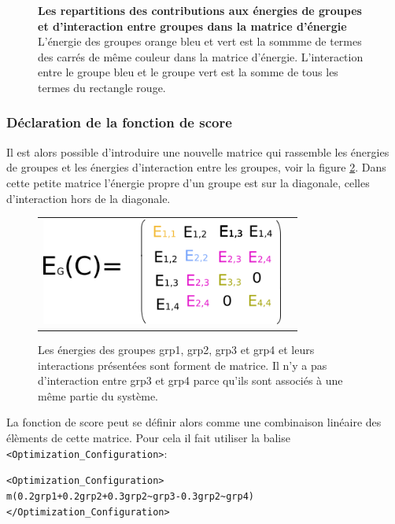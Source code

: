 \begin{enumerate}
\begin{figure}[!htbp]
     \caption{\textbf{Les repartitions des contributions aux énergies de groupes et d'interaction entre groupes dans la matrice d'énergie} L'énergie des groupes orange bleu et vert est la sommme de termes des carrés de même couleur dans la matrice d'énergie. L'interaction entre le groupe bleu et le groupe vert est la somme de tous les termes du rectangle rouge.}
\label{fig:matrix_grp}
   \end{figure}
   

\subsubsection{Déclaration de la fonction de score}
\label{sub:score}
Il est alors possible d'introduire une nouvelle matrice qui rassemble les énergies de groupes et les énergies d'interaction entre les groupes, voir la figure \ref{fig:group_matrix}. Dans cette petite matrice l'énergie propre d'un groupe est sur la diagonale, celles d'interaction hors de la diagonale.



   \begin{figure}[!htbp]
     \centering
     \begin{tabular}{cc}
       \includegraphics[width=8cm]{figure/group_matrix.png} &
     \end{tabular}
     
     \caption{ Les énergies des groupes grp1, grp2, grp3 et grp4 et leurs interactions présentées sont forment de matrice. Il n'y a pas d'interaction entre grp3 et grp4 parce qu'ils sont associés à une même partie du système.}
\label{fig:group_matrix}
   \end{figure}

La fonction de score peut se définir alors comme une combinaison linéaire des élèments de cette matrice. Pour cela il fait utiliser la balise  \verb!<Optimization_Configuration>!:



\verb!<Optimization_Configuration>! \\
\verb!m(0.2grp1+0.2grp2+0.3grp2~grp3-0.3grp2~grp4)! \\
\verb!</Optimization_Configuration>! \\



\end{enumerate}
